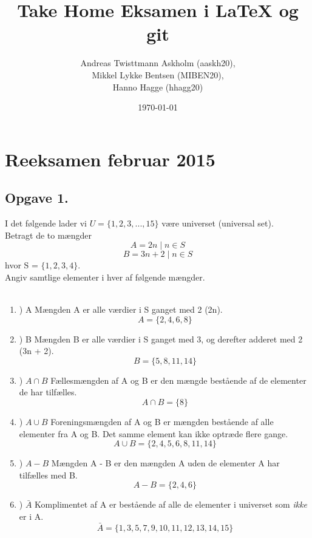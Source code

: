 \documentclass[a4paper,12pt]{article}
\title{Take Home Eksamen i \LaTeX{} og git}
\author{Andreas Twisttmann Askholm (aaskh20), \\Mikkel Lykke Bentsen (MIBEN20), \\Hanno Hagge (hhagg20)}
\date{\today}
\begin{document}
\maketitle
\renewcommand{\labelenumi}{\alph{enumi}}
\renewcommand{\labelenumii}{\arabic{enumii}}
\section{Reeksamen februar 2015}
\subsection{Opgave 1.}
I det følgende lader vi $U = \lbrace1, 2, 3, . . . , 15\rbrace$ være universet (universal set).\\
Betragt de to mængder\\
$$A = {2n \mid n \in S}$$
$$B = {3n + 2 \mid n \in S}$$
hvor S = $\lbrace1, 2, 3, 4\rbrace.$ \\
Angiv samtlige elementer i hver af følgende mængder.
\\\\
\begin{enumerate}


\item) A  \hspace{5mm} Mængden A er alle værdier i  S ganget med 2 (2n).$$ A = \lbrace 2, 4, 6, 8\rbrace$$
\item) B \hspace{5mm} Mængden B er alle værdier i S ganget med 3, og derefter adderet med 2 (3n + 2). $$ B = \lbrace 5, 8, 11, 14 \rbrace$$
\item) $A \cap B$ \hspace{5mm} Fællesmængden af A og B er den mængde bestående af de elementer de har tilfælles. $$ A \cap B = \lbrace8\rbrace$$
\item) $A \cup B$ \hspace{5mm} Foreningsmængden af A og B er mængden bestående af alle elementer fra A og B. Det samme element kan ikke optræde flere gange. $$ A \cup B = \lbrace 2, 4, 5, 6, 8, 11, 14\rbrace$$
\item) $A - B$ \hspace{5mm} Mængden A - B er den mængden A uden de elementer A har tilfælles med B. $$ A - B = \lbrace 2, 4, 6 \rbrace $$
\item) $ \bar{A}$ \hspace{5mm} Komplimentet af A er bestående af alle de elementer i universet som \emph{ikke} er i A. $$ \bar{A} = \lbrace 1, 3, 5, 7, 9, 10, 11, 12, 13, 14, 15 \rbrace$$
\end{enumerate}
\end{document}
